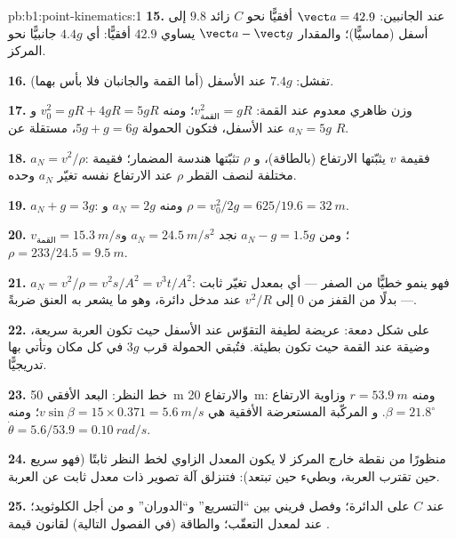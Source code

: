 \begin{solution}{pb:b1:point-kinematics:1}
\textbf{15.} عند الجانبين: $\vect a = 42.9$ أفقيًّا نحو $C$ زائد $9.8$
إلى أسفل (مماسيًّا)؛ والمقدار $\vect a - \vect g$ يساوي $42.9$ أفقيًّا: أي $4.4g$
جانبيًّا نحو المركز.

\textbf{16.} تفشل: $7.4g$ عند الأسفل (أما القمة والجانبان فلا بأس بهما).

\textbf{17.} وزن ظاهري معدوم عند القمة: $v_{\text{القمة}}^2 = gR$؛
ومنه $v_0^2 = gR + 4gR = 5gR$ و $a_N = 5g$ عند الأسفل، فتكون الحمولة
$5g + g = 6g$، مستقلة عن $R$.

\textbf{18.} $a_N = v^2/\rho$: فقيمة $v$ يثبّتها الارتفاع (بالطاقة)، و $\rho$
تثبّتها هندسة المضمار؛ فقيمة مختلفة لنصف القطر $\rho$ عند الارتفاع نفسه تغيّر
$a_N$ وحده.

\textbf{19.} $a_N + g = 3g$: ومنه $a_N = 2g$ و $\rho = v_0^2/2g = 625/19.6 =
\qty{32}{m}$.

\textbf{20.} $v_{\text{القمة}} = \qty{15.3}{m/s}$؛ ومن $a_N - g = 1.5g$ نجد $a_N =
\qty{24.5}{m/s^2}$ و $\rho = 233/24.5 = \qty{9.5}{m}$.

\textbf{21.} $a_N = v^2/\rho = v^2s/A^2 = v^3t/A^2$: فهو ينمو خطيًّا
من الصفر --- أي بمعدل تغيّر ثابت  --- بدلًا من
القفز من $0$ إلى $v^2/R$ عند مدخل دائرة، وهو ما يشعر به العنق ضربةً.

\textbf{22.} على شكل دمعة: عريضة لطيفة التقوّس عند الأسفل حيث تكون
العربة سريعة، وضيقة عند القمة حيث تكون بطيئة. فتُبقي الحمولة قرب
$3g$ في كل مكان وتأتي بها تدريجيًّا.

\textbf{23.} خط النظر: البعد الأفقي \qty{50}{m} والارتفاع
\qty{20}{m}: ومنه $r = \qty{53.9}{m}$ وزاوية الارتفاع $\beta = 21.8^\circ$. و
المركّبة المستعرضة  الأفقية هي $v\sin\beta = 15 \times
0.371 = \qty{5.6}{m/s}$؛ ومنه $\dot\theta = 5.6/53.9 = \qty{0.10}{rad/s}$.

\textbf{24.} منظورًا من نقطة خارج المركز لا يكون المعدل الزاوي لخط
النظر ثابتًا (فهو سريع حين تقترب العربة، وبطيء حين تبتعد):
فتنزلق آلة تصوير ذات معدل ثابت عن العربة.

\textbf{25.}  عند $C$   على
الدائرة؛ وفصل فريني بين ``التسريع'' و``الدوران'' و
من أجل الكلوثويد؛  عند  لمعدل
التعقّب؛ والطاقة (في الفصول التالية) لقانون قيمة .
\end{solution}

